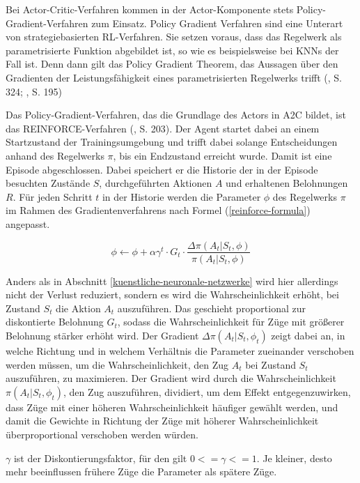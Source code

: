 Bei Actor-Critic-Verfahren kommen in der Actor-Komponente stets Policy-Gradient-Verfahren zum Einsatz. Policy Gradient Verfahren sind eine Unterart von strategiebasierten RL-Verfahren. Sie setzen voraus, dass das Regelwerk als parametrisierte Funktion abgebildet ist, so wie es beispielsweise bei KNNs der Fall ist. Denn dann gilt das Policy Gradient Theorem, das Aussagen über den Gradienten der Leistungsfähigkeit eines parametrisierten Regelwerks trifft (\cite{Sutton.2018}, S. 324; \cite{Albrecht.2024}, S. 195)

Das Policy-Gradient-Verfahren, das die Grundlage des Actors in A2C bildet, ist das REINFORCE-Verfahren (\cite{Albrecht.2024}, S. 203). Der Agent startet dabei an einem Startzustand der Trainingsumgebung und trifft dabei solange Entscheidungen anhand des Regelwerks $\pi$, bis ein Endzustand erreicht wurde. Damit ist eine Episode abgeschlossen. Dabei speichert er die Historie der in der Episode besuchten Zustände $S$, durchgeführten Aktionen $A$ und erhaltenen Belohnungen $R$. Für jeden Schritt $t$ in der Historie werden die Parameter $\phi$ des Regelwerks $\pi$ im Rahmen des Gradientenverfahrens nach Formel (\ref{reinforce-formula}) angepasst.

\begin{equation}\label{reinforce-formula}
	\phi \leftarrow \phi {+} \alpha \gamma ^{t} \cdot G_t \cdot \frac{\Delta \pi (A_t|S_t, \phi)}{\pi (A_t|S_t, \phi)}
\end{equation}


Anders als in Abschnitt \ref{kuenstliche-neuronale-netzwerke} wird hier allerdings nicht der Verlust reduziert, sondern es wird die Wahrscheinlichkeit erhöht, bei Zustand $S_t$ die Aktion $A_t$ auszuführen. Das geschieht proportional zur diskontierte Belohnung $G_t$, sodass die Wahrscheinlichkeit für Züge mit größerer Belohnung stärker erhöht wird. Der Gradient $\Delta \pi (A_t|S_t, \phi_t)$ zeigt dabei an, in welche Richtung und in welchem Verhältnis die Parameter zueinander verschoben werden müssen, um die Wahrscheinlichkeit, den Zug $A_t$ bei Zustand $S_t$ auszuführen, zu maximieren. Der Gradient wird durch die Wahrscheinlichkeit $\pi (A_t|S_t, \phi_t)$, den Zug auszuführen, dividiert, um dem Effekt entgegenzuwirken, dass Züge mit einer höheren Wahrscheinlichkeit häufiger gewählt werden, und damit die Gewichte in Richtung der Züge mit höherer Wahrscheinlichkeit überproportional verschoben werden würden.

$\gamma$ ist der Diskontierungsfaktor, für den gilt $0 <= \gamma <= 1$. Je kleiner, desto mehr beeinflussen frühere Züge die Parameter als spätere Züge.

